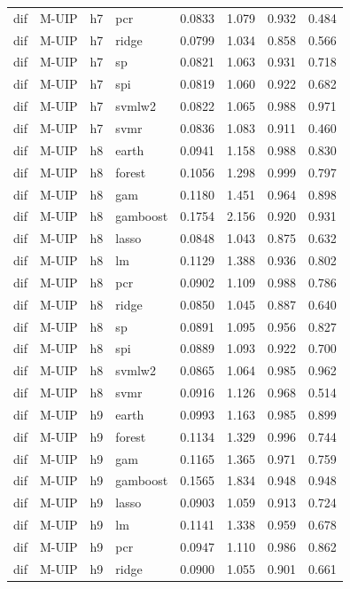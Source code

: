 \begin{ThreePartTable}
\begin{longtable}[t]{llclcccc}
dif & M-UIP & h7 & pcr & 0.0833 & 1.079 & 0.932 & 0.484\\
dif & M-UIP & h7 & ridge & 0.0799 & 1.034 & 0.858 & 0.566\\
dif & M-UIP & h7 & sp & 0.0821 & 1.063 & 0.931 & 0.718\\
dif & M-UIP & h7 & spi & 0.0819 & 1.060 & 0.922 & 0.682\\
dif & M-UIP & h7 & svmlw2 & 0.0822 & 1.065 & 0.988 & 0.971\\
dif & M-UIP & h7 & svmr & 0.0836 & 1.083 & 0.911 & 0.460\\
\addlinespace
dif & M-UIP & h8 & earth & 0.0941 & 1.158 & 0.988 & 0.830\\
dif & M-UIP & h8 & forest & 0.1056 & 1.298 & 0.999 & 0.797\\
dif & M-UIP & h8 & gam & 0.1180 & 1.451 & 0.964 & 0.898\\
dif & M-UIP & h8 & gamboost & 0.1754 & 2.156 & 0.920 & 0.931\\
dif & M-UIP & h8 & lasso & 0.0848 & 1.043 & 0.875 & 0.632\\
dif & M-UIP & h8 & lm & 0.1129 & 1.388 & 0.936 & 0.802\\
dif & M-UIP & h8 & pcr & 0.0902 & 1.109 & 0.988 & 0.786\\
dif & M-UIP & h8 & ridge & 0.0850 & 1.045 & 0.887 & 0.640\\
dif & M-UIP & h8 & sp & 0.0891 & 1.095 & 0.956 & 0.827\\
dif & M-UIP & h8 & spi & 0.0889 & 1.093 & 0.922 & 0.700\\
dif & M-UIP & h8 & svmlw2 & 0.0865 & 1.064 & 0.985 & 0.962\\
dif & M-UIP & h8 & svmr & 0.0916 & 1.126 & 0.968 & 0.514\\
\addlinespace
dif & M-UIP & h9 & earth & 0.0993 & 1.163 & 0.985 & 0.899\\
dif & M-UIP & h9 & forest & 0.1134 & 1.329 & 0.996 & 0.744\\
dif & M-UIP & h9 & gam & 0.1165 & 1.365 & 0.971 & 0.759\\
dif & M-UIP & h9 & gamboost & 0.1565 & 1.834 & 0.948 & 0.948\\
dif & M-UIP & h9 & lasso & 0.0903 & 1.059 & 0.913 & 0.724\\
dif & M-UIP & h9 & lm & 0.1141 & 1.338 & 0.959 & 0.678\\
dif & M-UIP & h9 & pcr & 0.0947 & 1.110 & 0.986 & 0.862\\
dif & M-UIP & h9 & ridge & 0.0900 & 1.055 & 0.901 & 0.661\\

\end{longtable}
\end{ThreePartTable}
